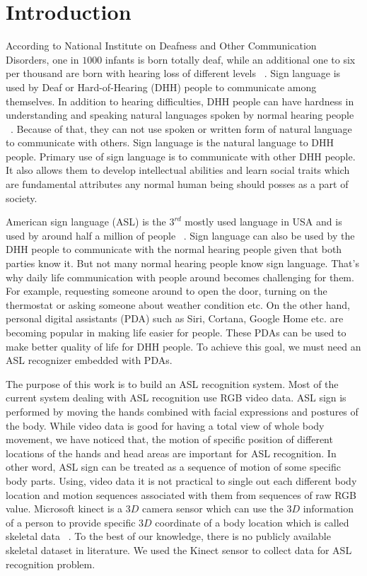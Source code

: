\documentclass[10pt,twocolumn,letterpaper]{article}
\begin{document}
\section{Introduction}

According to National Institute on Deafness and Other Communication Disorders, one in $1000$ infants is born totally deaf, while an additional one to six per thousand are born with hearing loss of different levels ~\cite{3072291}. Sign language is used by Deaf or Hard-of-Hearing (DHH) people to communicate among themselves. In addition to hearing difficulties, DHH people can have hardness in understanding and speaking natural languages spoken by normal hearing people ~\cite{doi:10.1080/01690965.2012.705006}. Because of that, they can not use spoken or written form of natural language to communicate with others. Sign language is the natural language to DHH people. Primary use of sign language is to communicate with other DHH people. It also allows them to develop intellectual abilities and learn social traits which are fundamental attributes any normal human being should posses as a part of society.

American sign language (ASL) is the $3^{rd}$ mostly used language in USA and is used by around half a million of people ~\cite{sign_lang_study}. Sign language can also be used by the DHH people to communicate with the normal hearing people given that both parties know it. But not many normal hearing people know sign language. That's why daily life communication with people around becomes challenging for them. For example, requesting someone around to open the door, turning on the thermostat or asking someone about weather condition etc. On the other hand, personal digital assistants (PDA) such as Siri, Cortana, Google Home etc. are becoming popular in making life easier for people. These PDAs can be used to make better quality of life for DHH people. To achieve this goal, we must need an ASL recognizer embedded with PDAs.

The purpose of this work is to build an ASL recognition system. Most of the current  system dealing with ASL recognition use RGB video data. ASL sign is performed by moving the hands combined with facial expressions and postures of the body. While video data is good for having a total view of whole body movement, we have noticed that, the motion of specific position of different locations of the hands and head areas are important for ASL recognition. In other word, ASL sign can be treated as a sequence of motion of some specific body parts. Using, video data it is not practical to single out each different body location and motion sequences associated with them from sequences of raw RGB value. Microsoft kinect is a $3D$ camera sensor which can use the $3D$ information of a person to provide specific $3D$ coordinate of a body location which is called skeletal data ~\cite{Zhang:2012:MKS:2225053.2225203}. To the best of our knowledge, there is no publicly available skeletal dataset in literature. We used the Kinect sensor to collect data for ASL recognition problem. 
\end{document}
